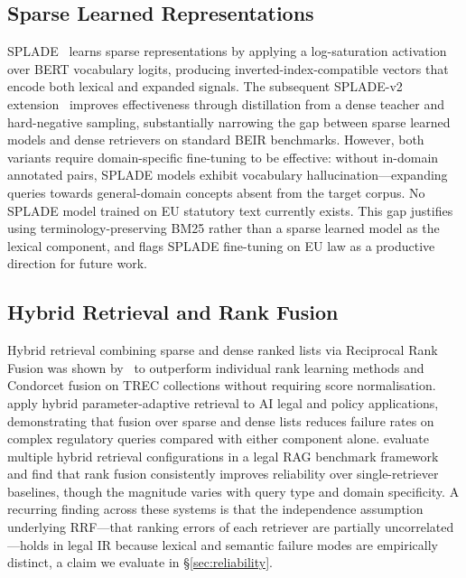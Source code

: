 \documentclass{iosart2x}
\newcommand{\rrf}{RRF\xspace}
\begin{document}
\subsection{Sparse Learned Representations}
\label{sec:related-splade}

SPLADE~\cite{formal2021splade} learns sparse representations by applying
a log-saturation activation over BERT vocabulary logits, producing
inverted-index-compatible vectors that encode both lexical and expanded
signals.  The subsequent SPLADE-v2 extension~\cite{formal2022splade2}
improves effectiveness through distillation from a dense teacher and
hard-negative sampling, substantially narrowing the gap between sparse
learned models and dense retrievers on standard BEIR benchmarks.
However, both variants require domain-specific fine-tuning to be
effective: without in-domain annotated pairs, SPLADE models exhibit
vocabulary hallucination---expanding queries towards general-domain
concepts absent from the target corpus.  No SPLADE model trained on
EU statutory text currently exists.  This gap justifies using
terminology-preserving BM25 rather than a sparse learned model as
the lexical component, and flags SPLADE fine-tuning on EU law as
a productive direction for future work.

\subsection{Hybrid Retrieval and Rank Fusion}
\label{sec:related-hybrid}

Hybrid retrieval combining sparse and dense ranked lists via Reciprocal
Rank Fusion was shown by~\citet{cormack2009rrf} to outperform individual
rank learning methods and Condorcet fusion on TREC collections without
requiring score normalisation.  \citet{hyparag2024} apply hybrid
parameter-adaptive retrieval to AI legal and policy applications,
demonstrating that fusion over sparse and dense lists reduces failure
rates on complex regulatory queries compared with either component
alone.  \citet{lrage2024} evaluate multiple hybrid retrieval
configurations in a legal RAG benchmark framework and find that rank
fusion consistently improves reliability over single-retriever baselines,
though the magnitude varies with query type and domain specificity.
A recurring finding across these systems is that the independence
assumption underlying \rrf---that ranking errors of each retriever
are partially uncorrelated---holds in legal IR because lexical and
semantic failure modes are empirically distinct, a claim we evaluate
in \S\ref{sec:reliability}.
\end{document}
